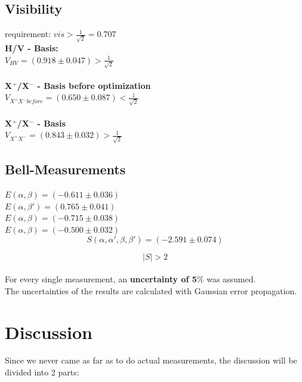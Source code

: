 \documentclass[12pt,a4paper]{article}
\begin{document}
\begin{multicols}{2}
\subsection{Visibility}
requirement: $vis > \frac{1}{\sqrt{2}} = 0.707$\\

\noindent \textbf{H/V - Basis:}\\

$V_{HV}= (0.918 \pm 0.047) > \frac{1}{\sqrt{2}}$\\
\\
\textbf{X$^+$/X$^-$ - Basis before optimization}\\

$V_{X^+ X^- before}=(0.650 \pm 0.087) < \frac{1}{\sqrt{2}}$\\
\\
\textbf{X$^+$/X$^-$ - Basis}\\

$V_{X^+ X^- }=(0.843 \pm 0.032) > \frac{1}{\sqrt{2}}$\\

\subsection{Bell-Measurements}
$E(\alpha, \beta) = (-0.611 \pm 0.036)$\\
$E(\alpha, \beta ') = (0.765 \pm 0.041)$\\
$E(\alpha, \beta) = (-0.715\pm 0.038)$\\
$E(\alpha, \beta) = (-0.500 \pm 0.032)$\\

$$S(\alpha, \alpha ', \beta , \beta ') = (-2.591 \pm 0.074)$$

$$|S| > 2$$\\

\noindent For every single measurement, an \textbf{uncertainty of 5$\%$} was assumed.\\
The uncertainties of the results are calculated with Gaussian error propagation.




\section{Discussion}
Since we never came as far as to do actual measurements, the discussion will be divided into 2 parts:


\end{multicols}
\end{document}

